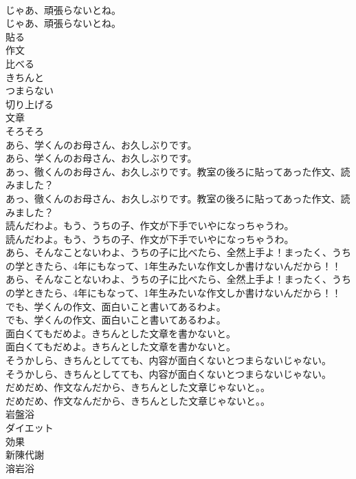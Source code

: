 \documentclass[8pt]{extreport}
\begin{document}
\begin{CJK}{UTF8}{min}
\\	じゃあ、頑張らないとね。	
\\	じゃあ、頑張らないとね。 
\\	貼る
\\	作文
\\	比べる
\\	きちんと
\\	つまらない
\\	切り上げる
\\	文章
\\	そろそろ
\\	あら、学くんのお母さん、お久しぶりです。	
\\	あら、学くんのお母さん、お久しぶりです。 
\\	あっ、徹くんのお母さん、お久しぶりです。教室の後ろに貼ってあった作文、読みました？	
\\	あっ、徹くんのお母さん、お久しぶりです。教室の後ろに貼ってあった作文、読みました？ 
\\	読んだわよ。もう、うちの子、作文が下手でいやになっちゃうわ。	
\\	読んだわよ。もう、うちの子、作文が下手でいやになっちゃうわ。 
\\	あら、そんなことないわよ、うちの子に比べたら、全然上手よ！まったく、うちの学ときたら、4年にもなって、1年生みたいな作文しか書けないんだから！！	
\\	あら、そんなことないわよ、うちの子に比べたら、全然上手よ！まったく、うちの学ときたら、4年にもなって、1年生みたいな作文しか書けないんだから！！ 
\\	でも、学くんの作文、面白いこと書いてあるわよ。	
\\	でも、学くんの作文、面白いこと書いてあるわよ。 
\\	面白くてもだめよ。きちんとした文章を書かないと。	
\\	面白くてもだめよ。きちんとした文章を書かないと。 
\\	そうかしら、きちんとしてても、内容が面白くないとつまらないじゃない。	
\\	そうかしら、きちんとしてても、内容が面白くないとつまらないじゃない。 
\\	だめだめ、作文なんだから、きちんとした文章じゃないと。。	
\\	だめだめ、作文なんだから、きちんとした文章じゃないと。。 
\\	岩盤浴
\\	ダイエット
\\	効果
\\	新陳代謝
\\	溶岩浴

\end{CJK}
\end{document}
